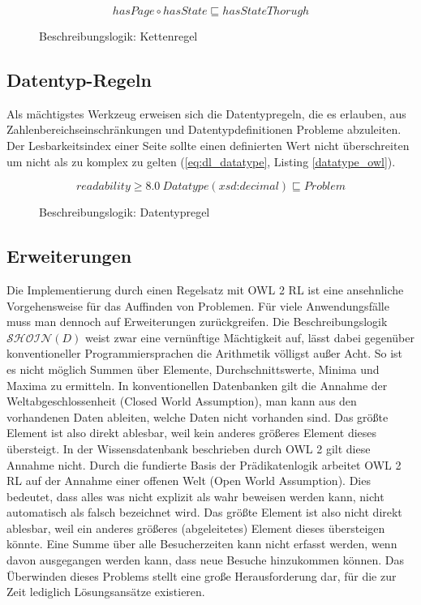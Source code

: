 \documentclass[runningheads,a4paper]{llncs}
\begin{document}
\begin{figure}
\begin{equation}
hasPage \circ hasState \sqsubseteq hasStateThorugh
\label{eq:dl_list}
\end{equation}
\caption{Beschreibungslogik: Kettenregel}
\end{figure}



\subsection{Datentyp-Regeln}
Als mächtigstes Werkzeug erweisen sich die Datentypregeln, die es erlauben, aus Zahlenbereichseinschränkungen und Datentypdefinitionen Probleme abzuleiten. 
Der Lesbarkeitsindex einer Seite sollte einen definierten Wert nicht überschreiten um nicht als zu komplex zu gelten (\eqref{eq:dl_datatype}, Listing \ref{datatype_owl}).


\begin{figure}
\begin{equation}
readability \geq 8.0\ Datatype(\textit{xsd:decimal}) \sqsubseteq Problem
\label{eq:dl_datatype}
\end{equation}
\caption{Beschreibungslogik: Datentypregel}
\end{figure}



\subsection{Erweiterungen}
Die Implementierung durch einen Regelsatz mit OWL 2 RL ist eine ansehnliche Vorgehensweise für das Auffinden von Problemen. 
Für viele Anwendungsfälle muss man dennoch auf Erweiterungen zurückgreifen. 
Die Beschreibungslogik \(\mathcal{SHOIN}(D)\) weist zwar eine vernünftige Mächtigkeit auf, lässt dabei gegenüber konventioneller Programmiersprachen die Arithmetik völligst außer Acht. 
So ist es nicht möglich Summen über Elemente, Durchschnittswerte, Minima und Maxima zu ermitteln. 
In konventionellen Datenbanken gilt die Annahme der Weltabgeschlossenheit (Closed World Assumption), man kann aus den vorhandenen Daten ableiten, welche Daten nicht vorhanden sind. 
Das größte Element ist also direkt ablesbar, weil kein anderes größeres Element dieses übersteigt. 
In der Wissensdatenbank beschrieben durch OWL 2 gilt diese Annahme nicht. 
Durch die fundierte Basis der Prädikatenlogik arbeitet OWL 2 RL auf der Annahme einer offenen Welt (Open World Assumption). 
Dies bedeutet, dass alles was nicht explizit als wahr beweisen werden kann, nicht automatisch als falsch bezeichnet wird. 
Das größte Element ist also nicht direkt ablesbar, weil ein anderes größeres (abgeleitetes) Element dieses übersteigen könnte. 
Eine Summe über alle Besucherzeiten kann nicht erfasst werden, wenn davon ausgegangen werden kann, dass neue Besuche hinzukommen können.
Das Überwinden dieses Problems stellt eine große Herausforderung dar, für die zur Zeit lediglich Lösungsansätze existieren. 
\end{document}
